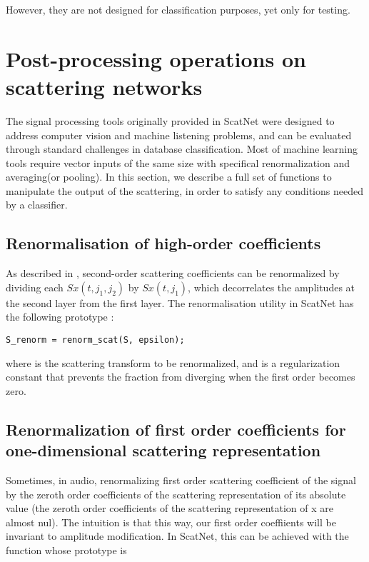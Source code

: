 \documentclass{article}
\begin{document}
However, they are not designed for classification purposes, yet only for testing.



\section{Post-processing operations on scattering networks \label{sec:utilities}}
The signal processing tools originally provided in ScatNet were designed to address computer vision and machine listening problems, and can be evaluated through standard challenges in database classification. Most of machine learning tools require vector inputs of the same size with specifical renormalization and averaging(or pooling). In this section, we describe a full set of functions to manipulate the output of the scattering, in order to satisfy any conditions needed by a classifier.

\subsection{Renormalisation of high-order coefficients}
As described in \cite{joakim}, second-order scattering coefficients can be renormalized by dividing each $Sx(t,j_1,j_2)$ by $Sx(t,j_1)$, which decorrelates the amplitudes at the second layer from the first layer. The renormalisation utility in ScatNet has the following prototype :

\begin{lstlisting}
S_renorm = renorm_scat(S, epsilon);
\end{lstlisting}

where  is the scattering transform to be renormalized, and  is a regularization constant that prevents the fraction from diverging when the first order becomes zero.

\subsection{Renormalization of first order coefficients for one-dimensional scattering representation}
Sometimes, in audio, renormalizing first order scattering coefficient of the signal by the zeroth order coefficients of the scattering representation of its absolute value (the zeroth order coefficients of the scattering representation of x are almost nul). The intuition is that this way, our first order coeffiients will be invariant to amplitude modification. 
In ScatNet, this can be achieved with the function  whose prototype is 
\end{document}
